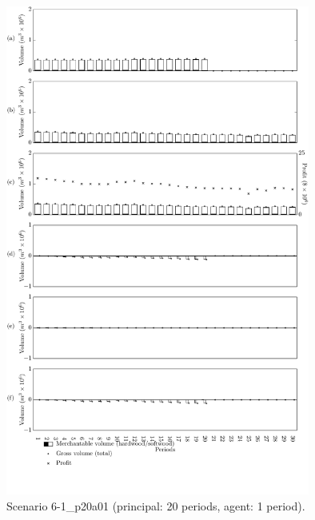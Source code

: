 \begin{figure}[h]
  \centering
  \includegraphics[width=10cm]{images/appendix/s6-1_p20a01}
  \caption{Scenario 6-1\_p20a01 (principal: 20 periods, agent: 1 period).}
  \label{fig:s6-1_p20a01}
\end{figure}


